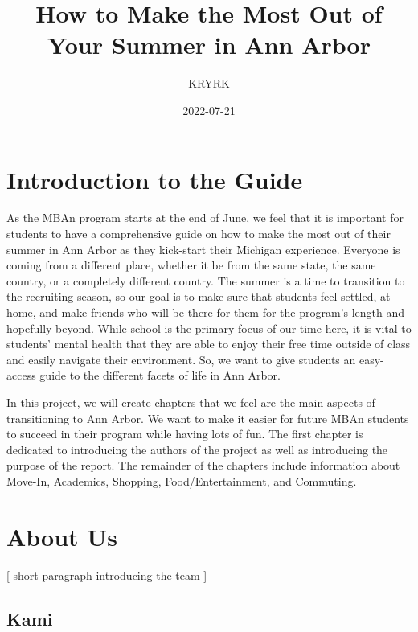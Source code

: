 \documentclass[
]{book}
\title{How to Make the Most Out of Your Summer in Ann Arbor}
\author{KRYRK}
\date{2022-07-21}
\begin{document}
\maketitle

{
\setcounter{tocdepth}{1}
\tableofcontents
}
\hypertarget{introduction-to-the-guide}{%
\chapter*{Introduction to the Guide}\label{introduction-to-the-guide}}

As the MBAn program starts at the end of June, we feel that it is important for students to have a comprehensive guide on how to make the most out of their summer in Ann Arbor as they kick-start their Michigan experience. Everyone is coming from a different place, whether it be from the same state, the same country, or a completely different country. The summer is a time to transition to the recruiting season, so our goal is to make sure that students feel settled, at home, and make friends who will be there for them for the program's length and hopefully beyond. While school is the primary focus of our time here, it is vital to students' mental health that they are able to enjoy their free time outside of class and easily navigate their environment. So, we want to give students an easy-access guide to the different facets of life in Ann Arbor.

In this project, we will create chapters that we feel are the main aspects of transitioning to Ann Arbor. We want to make it easier for future MBAn students to succeed in their program while having lots of fun. The first chapter is dedicated to introducing the authors of the project as well as introducing the purpose of the report. The remainder of the chapters include information about Move-In, Academics, Shopping, Food/Entertainment, and Commuting.

\hypertarget{about-us}{%
\chapter*{About Us}\label{about-us}}

{[} short paragraph introducing the team {]}

\hypertarget{kami}{%
\section{Kami}\label{kami}}
\end{document}
